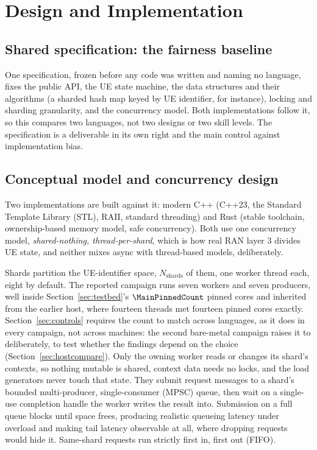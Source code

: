 \chapter{Design and Implementation\label{chapter:design}}

\section{Shared specification: the fairness baseline}
\label{sec:fairness}
One specification, frozen before any code was written and naming no language, fixes the public
API, the UE state machine, the data structures and their algorithms (a sharded hash map keyed by
UE identifier, for instance), locking and sharding granularity, and the concurrency model. Both
implementations follow it, so this compares two languages, not two designs or two skill levels.
The specification is a deliverable in its own right and the main control against implementation
bias.

\section{Conceptual model and concurrency design}\label{sec:concurrency}
Two implementations are built against it: modern C++ (C++23, the Standard Template Library (STL),
RAII, standard threading) and Rust (stable toolchain, ownership-based memory model, safe
concurrency). Both use one concurrency model, \emph{shared-nothing, thread-per-shard}, which is
how real RAN layer 3 divides UE state, and neither mixes async with thread-based models,
deliberately.

Shards partition the UE-identifier space, $N_{\text{shards}}$ of them, one worker thread each,
eight by default. The reported campaign runs seven workers and seven producers, well inside
Section~\ref{sec:testbed}'s $\MainPinnedCount$ pinned cores and inherited from the earlier host,
where fourteen threads met fourteen pinned cores exactly. Section~\ref{sec:controls} requires the
count to match across languages, as it does in every campaign, not across machines: the second
bare-metal campaign raises it to \BmShards{} deliberately, to test whether the findings depend on
the choice (Section~\ref{sec:hostcompare}). Only the owning worker reads or changes its shard's
contexts, so nothing mutable is shared, context data needs no locks, and the load generators never
touch that state. They submit request messages to a shard's bounded multi-producer,
single-consumer (MPSC) queue, then wait on a single-use completion handle the worker writes the
result into. Submission on a full queue blocks until space frees, producing realistic queueing
latency under overload and making tail latency observable at all, where dropping requests would
hide it. Same-shard requests run strictly first in, first out (FIFO).

